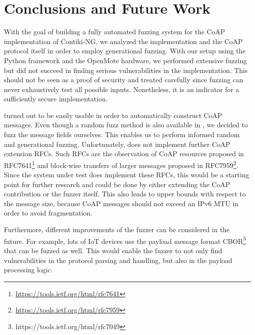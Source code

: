 \section{Conclusions and Future Work}
\label{section:conclusion}


With the goal of building a fully automated fuzzing system for the CoAP implementation of Contiki-NG, we analyzed the implementation and the CoAP protocol itself in order to employ generational fuzzing. With our setup using the Python framework \scapy and the OpenMote hardware, we performed extensive fuzzing but did not succeed in finding serious vulnerabilities in the implementation. This should not be seen as a proof of security and treated carefully since fuzzing can never exhaustively test all possible inputs. Nonetheless, it is an indicator for a sufficiently secure implementation.

\scapy turned out to be easily usable in order to automatically construct CoAP messages. Even though a random fuzz method is also available in \scapy, we decided to fuzz the message fields ourselves. This enables us to perform informed random and generational fuzzing. Unfortunately, \scapy does not implement further CoAP extension RFCs. Such RFCs are the observation of CoAP resources proposed in RFC7641\footnote{\url{https://tools.ietf.org/html/rfc7641}} and block-wise transfers of larger messages proposed in RFC7959\footnote{\url{https://tools.ietf.org/html/rfc7959}}. Since the system under test does implement these RFCs, this would be a starting point for further research and could be done by either extending the \scapy CoAP contribution or the fuzzer itself. This also leads to upper bounds with respect to the message size, because CoAP messages should not exceed an IPv6 MTU in order to avoid fragmentation.

Furthermore, different improvements of the fuzzer can be considered in the future. For example, lots of IoT devices use the payload message format CBOR\footnote{https://tools.ietf.org/html/rfc7049} that can be fuzzed as well. This would enable the fuzzer to not only find vulnerabilities in the protocol parsing and handling, but also in the payload processing logic. 

